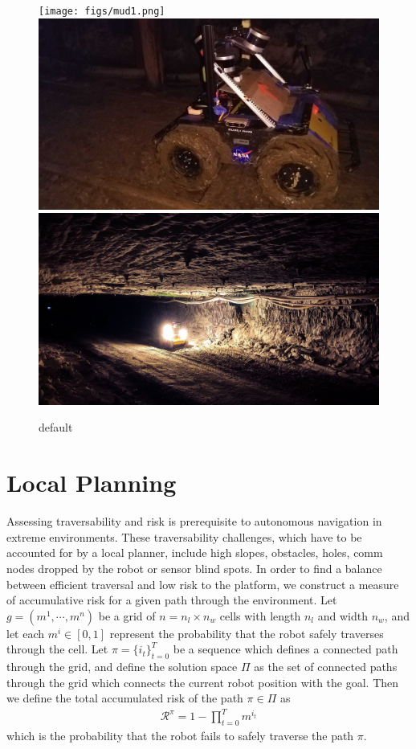 \documentclass[letterpaper, 10 pt, conference]{ieeeconf}  %
\begin{document}
\begin{figure}[b]

\centering
\texttt{[image: figs/mud1.png]}\hfill
\includegraphics[width=.32\textwidth]{figs/mud2.jpg}\hfill
\includegraphics[width=.32\textwidth]{figs/arch1.jpg}

\caption{default}
\label{fig:figure3}

\end{figure}


\section{Local Planning}
Assessing traversability and risk is prerequisite to autonomous navigation in extreme environments.  These traversability challenges, which have to be accounted for by a local planner, include high slopes, obstacles, holes, comm nodes dropped by the robot or sensor blind spots.  In order to find a balance between efficient traversal and low risk to the platform, we construct a measure of accumulative risk for a given path through the environment.  Let $g=(m^1,\cdots,m^n)$ be a grid of $n=n_l\times n_w$ cells with length $n_l$ and width $n_w$, and let each $m^i\in[0,1]$ represent the probability that the robot safely traverses through the cell.  Let $\pi=\{i_t\}_{t=0}^T$ be a sequence which defines a connected path through the grid, and define the solution space $\Pi$ as the set of connected paths through the grid which connects the current robot position with the goal.  Then we define the total accumulated risk of the path $\pi\in\Pi$ as 
\begin{align}
 \mathcal{R}^{\pi}=1-\prod_{t=0}^Tm^{i_t}
\end{align}
which is the probability that the robot fails to safely traverse the path $\pi$.  
\end{document}
